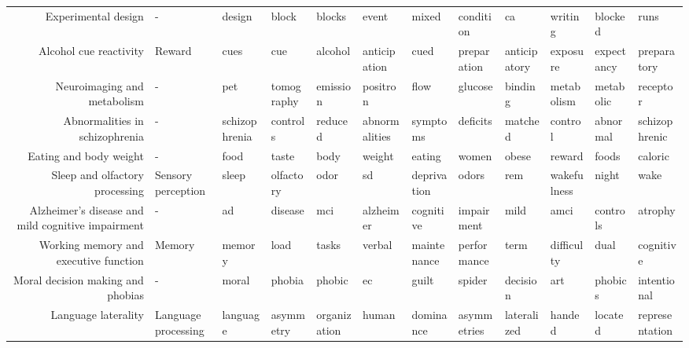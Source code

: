 \documentclass[english]{article}
\begin{document}
\begin{landscape}
\begin{supertabular}{rlllllllllll}
                 Experimental design &                   - &           design &         block &          blocks &          event &       mixed &      condition &            ca &        writing &       blocked &           runs \\
              Alcohol cue reactivity &              Reward &             cues &           cue &         alcohol &   anticipation &        cued &    preparation &  anticipatory &       exposure &    expectancy &    preparatory \\
         Neuroimaging and metabolism &                   - &              pet &    tomography &        emission &       positron &        flow &        glucose &       binding &     metabolism &     metabolic &       receptor \\
      Abnormalities in schizophrenia &                   - &    schizophrenia &      controls &         reduced &  abnormalities &    symptoms &       deficits &       matched &        control &      abnormal &  schizophrenic \\
              Eating and body weight &                   - &             food &         taste &            body &         weight &      eating &          women &         obese &         reward &         foods &        caloric \\
      Sleep and olfactory processing &  Sensory perception &            sleep &     olfactory &            odor &             sd & deprivation &          odors &           rem &    wakefulness &         night &           wake \\
Alzheimer's disease and mild cognitive impairment &                   - &               ad &       disease &             mci &      alzheimer &   cognitive &     impairment &          mild &           amci &      controls &        atrophy \\
Working memory and executive function &              Memory &           memory &          load &           tasks &         verbal & maintenance &    performance &          term &     difficulty &          dual &      cognitive \\
   Moral decision making and phobias &                   - &            moral &        phobia &          phobic &             ec &       guilt &         spider &      decision &            art &       phobics &    intentional \\
                 Language laterality & Language processing &         language &     asymmetry &    organization &          human &   dominance &    asymmetries &   lateralized &         handed &       located & representation \\

\end{supertabular}
\end{landscape}
\end{document}
